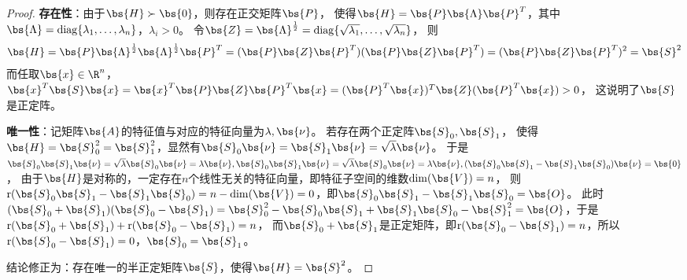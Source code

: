 \documentclass[12pt, a4paper, oneside, UTF8]{ctexbook}
\begin{document}
\begin{proof}
    \textbf{存在性}：由于$\bs{H} \succ \bs{0}$，则存在正交矩阵$\bs{P}$，
    使得$\bs{H}=\bs{P}\bs{\Lambda}\bs{P}^T$，其中$\bs{\Lambda}
    =\mathrm{diag}\{\lambda_1,\ldots,\lambda_n\}$，$\lambda_i > 0$。
    令$\bs{Z}=\bs{\Lambda}^{\frac{1}{2}}=\mathrm{diag}\{\sqrt{\lambda_1},\ldots,\sqrt{\lambda_n}\}$，
    则
    \begin{align*}
        \bs{H}=\bs{P}\bs{\Lambda}^{\frac{1}{2}}\bs{\Lambda}^{\frac{1}{2}}\bs{P}^T=(\bs{P}\bs{Z}\bs{P}^T)(\bs{P}\bs{Z}\bs{P}^T)
        =(\bs{P}\bs{Z}\bs{P}^T)^2=\bs{S}^2
    \end{align*}
    而任取$\bs{x}\in \R^n$，$\bs{x}^T\bs{S}\bs{x}=
    \bs{x}^T\bs{P}\bs{Z}\bs{P}^T\bs{x}=
    (\bs{P}^T\bs{x})^T\bs{Z}(\bs{P}^T\bs{x}) >0$，
    这说明了$\bs{S}$是正定阵。

    \textbf{唯一性}：记矩阵$\bs{A}$的特征值与对应的特征向量为$\lambda,\bs{\nu}$。
    若存在两个正定阵$\bs{S}_0,\bs{S}_1$，
    使得$\bs{H}=\bs{S}_0^2=\bs{S}_1^2$，显然有$\bs{S}_0\bs{\nu}=\bs{S}_1\bs{\nu}=\sqrt{\lambda}\bs{\nu}$。
    于是$\bs{S}_0\bs{S}_1\bs{\nu}=\sqrt{\lambda}\bs{S}_0\bs{\nu}=\lambda \bs{\nu},
    \bs{S}_0\bs{S}_1\bs{\nu}=\sqrt{\lambda}\bs{S}_0\bs{\nu}=\lambda \bs{\nu},
    (\bs{S}_0\bs{S}_1-\bs{S}_1\bs{S}_0)\bs{\nu}=\bs{0}$，
    由于$\bs{H}$是对称的，一定存在$n$个线性无关的特征向量，即特征子空间的维数$\mathrm{dim}(\bs{V})=n$，
    则$\mathrm{r}(\bs{S}_0\bs{S}_1-\bs{S}_1\bs{S}_0)=n-\mathrm{dim}(\bs{V})=0$，即$\bs{S}_0\bs{S}_1-\bs{S}_1\bs{S}_0=\bs{O}$。
    此时$(\bs{S}_0+\bs{S}_1)(\bs{S}_0-\bs{S}_1)=\bs{S}_0^2-\bs{S}_0\bs{S}_1+\bs{S}_1\bs{S}_0-\bs{S}_1^2=\bs{O}$，于是$\mathrm{r}(\bs{S}_0+\bs{S}_1)+\mathrm{r}(\bs{S}_0-\bs{S}_1)=n$，
    而$\bs{S}_0+\bs{S}_1$是正定矩阵，即$\mathrm{r}(\bs{S}_0-\bs{S}_1)=n$，所以$\mathrm{r}(\bs{S}_0-\bs{S}_1)=0$，$\bs{S}_0=\bs{S}_1$。
    
    结论修正为：存在唯一的半正定矩阵$\bs{S}$，使得$\bs{H}=\bs{S}^2$。
    
\end{proof}







\ifx\allfiles\undefined
\end{document}
